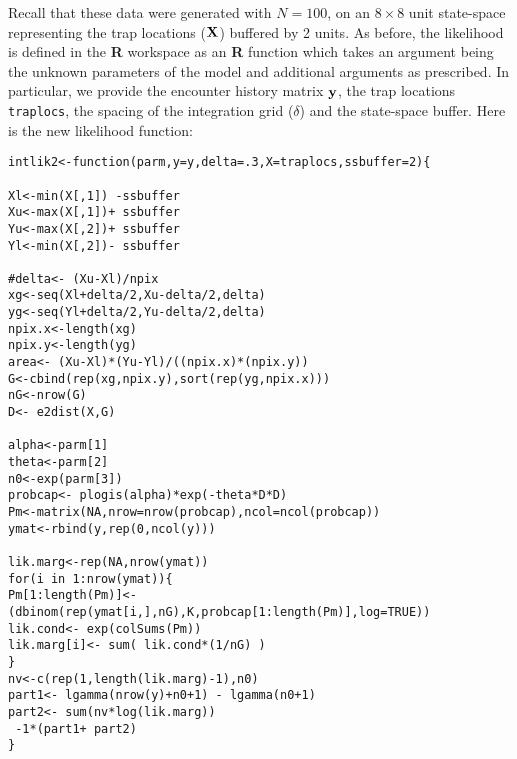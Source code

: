Recall that these data were generated with $N=100$, on an $8 \times 8$ unit
state-space representing the trap locations (${\bf X}$) buffered by 2 units.
As before, the likelihood is defined in the {\bf R} workspace as an
{\bf R}
function which takes an argument being the unknown parameters of the
model and additional arguments as prescribed. In particular, 
 we provide the encounter history matrix ${\bf y}$, the trap locations
\mbox{\tt traplocs}, the spacing of the integration grid ($\delta$) and the
state-space buffer. Here is the new likelihood function:
\begin{verbatim}
intlik2<-function(parm,y=y,delta=.3,X=traplocs,ssbuffer=2){

Xl<-min(X[,1]) -ssbuffer
Xu<-max(X[,1])+ ssbuffer
Yu<-max(X[,2])+ ssbuffer
Yl<-min(X[,2])- ssbuffer

#delta<- (Xu-Xl)/npix
xg<-seq(Xl+delta/2,Xu-delta/2,delta) 
yg<-seq(Yl+delta/2,Yu-delta/2,delta) 
npix.x<-length(xg)
npix.y<-length(yg)
area<- (Xu-Xl)*(Yu-Yl)/((npix.x)*(npix.y))
G<-cbind(rep(xg,npix.y),sort(rep(yg,npix.x)))
nG<-nrow(G)
D<- e2dist(X,G) 

alpha<-parm[1]
theta<-parm[2]
n0<-exp(parm[3])
probcap<- plogis(alpha)*exp(-theta*D*D)
Pm<-matrix(NA,nrow=nrow(probcap),ncol=ncol(probcap))
ymat<-rbind(y,rep(0,ncol(y)))

lik.marg<-rep(NA,nrow(ymat))
for(i in 1:nrow(ymat)){
Pm[1:length(Pm)]<- (dbinom(rep(ymat[i,],nG),K,probcap[1:length(Pm)],log=TRUE))
lik.cond<- exp(colSums(Pm))
lik.marg[i]<- sum( lik.cond*(1/nG) )  
}                                                 
nv<-c(rep(1,length(lik.marg)-1),n0)
part1<- lgamma(nrow(y)+n0+1) - lgamma(n0+1)
part2<- sum(nv*log(lik.marg))
 -1*(part1+ part2)
}
\end{verbatim}

